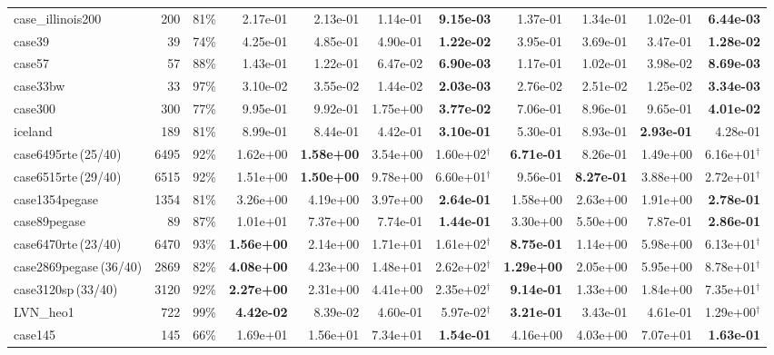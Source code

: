 \documentclass[10pt]{article}
\begin{document}
\begin{landscape}
\begin{table}[H]
\begin{tabular}{lrr rrrr rrrr}
case\_illinois200 & 200 & 81\% & 2.17e-01 & 2.13e-01 & 1.14e-01 & \textbf{9.15e-03} & 1.37e-01 & 1.34e-01 & 1.02e-01 & \textbf{6.44e-03} \\
case39 & 39 & 74\% & 4.25e-01 & 4.85e-01 & 4.90e-01 & \textbf{1.22e-02} & 3.95e-01 & 3.69e-01 & 3.47e-01 & \textbf{1.28e-02} \\
case57 & 57 & 88\% & 1.43e-01 & 1.22e-01 & 6.47e-02 & \textbf{6.90e-03} & 1.17e-01 & 1.02e-01 & 3.98e-02 & \textbf{8.69e-03} \\
case33bw & 33 & 97\% & 3.10e-02 & 3.55e-02 & 1.44e-02 & \textbf{2.03e-03} & 2.76e-02 & 2.51e-02 & 1.25e-02 & \textbf{3.34e-03} \\
case300 & 300 & 77\% & 9.95e-01 & 9.92e-01 & 1.75e+00 & \textbf{3.77e-02} & 7.06e-01 & 8.96e-01 & 9.65e-01 & \textbf{4.01e-02} \\
iceland & 189 & 81\% & 8.99e-01 & 8.44e-01 & 4.42e-01 & \textbf{3.10e-01} & 5.30e-01 & 8.93e-01 & \textbf{2.93e-01} & 4.28e-01 \\
case6495rte\,(25/40) & 6495 & 92\% & 1.62e+00 & \textbf{1.58e+00} & 3.54e+00 & 1.60e+02$^\dagger$ & \textbf{6.71e-01} & 8.26e-01 & 1.49e+00 & 6.16e+01$^\dagger$ \\
case6515rte\,(29/40) & 6515 & 92\% & 1.51e+00 & \textbf{1.50e+00} & 9.78e+00 & 6.60e+01$^\dagger$ & 9.56e-01 & \textbf{8.27e-01} & 3.88e+00 & 2.72e+01$^\dagger$ \\
case1354pegase & 1354 & 81\% & 3.26e+00 & 4.19e+00 & 3.97e+00 & \textbf{2.64e-01} & 1.58e+00 & 2.63e+00 & 1.91e+00 & \textbf{2.78e-01} \\
case89pegase & 89 & 87\% & 1.01e+01 & 7.37e+00 & 7.74e-01 & \textbf{1.44e-01} & 3.30e+00 & 5.50e+00 & 7.87e-01 & \textbf{2.86e-01} \\
case6470rte\,(23/40) & 6470 & 93\% & \textbf{1.56e+00} & 2.14e+00 & 1.71e+01 & 1.61e+02$^\dagger$ & \textbf{8.75e-01} & 1.14e+00 & 5.98e+00 & 6.13e+01$^\dagger$ \\
case2869pegase\,(36/40) & 2869 & 82\% & \textbf{4.08e+00} & 4.23e+00 & 1.48e+01 & 2.62e+02$^\dagger$ & \textbf{1.29e+00} & 2.05e+00 & 5.95e+00 & 8.78e+01$^\dagger$ \\
case3120sp\,(33/40) & 3120 & 92\% & \textbf{2.27e+00} & 2.31e+00 & 4.41e+00 & 2.35e+02$^\dagger$ & \textbf{9.14e-01} & 1.33e+00 & 1.84e+00 & 7.35e+01$^\dagger$ \\
LVN\_heo1 & 722 & 99\% & \textbf{4.42e-02} & 8.39e-02 & 4.60e-01 & 5.97e-02$^\dagger$ & \textbf{3.21e-01} & 3.43e-01 & 4.61e-01 & 1.29e+00$^\dagger$ \\
case145 & 145 & 66\% & 1.69e+01 & 1.56e+01 & 7.34e+01 & \textbf{1.54e-01} & 4.16e+00 & 4.03e+00 & 7.07e+01 & \textbf{1.63e-01} \\

\end{tabular}
\end{table}
\end{landscape}
\end{document}
